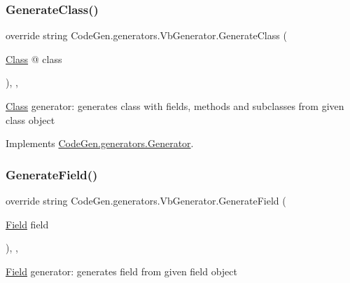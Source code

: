 \subsubsection{\texorpdfstring{Generate\+Class()}{GenerateClass()}}
{\footnotesize\ttfamily override string Code\+Gen.\+generators.\+Vb\+Generator.\+Generate\+Class (\begin{DoxyParamCaption}\item[{\mbox{\hyperlink{classCodeGen_1_1generators_1_1Class}{Class}} @}]{class }\end{DoxyParamCaption})\hspace{0.3cm}{\ttfamily [inline]}, {\ttfamily [protected]}, {\ttfamily [virtual]}}



\mbox{\hyperlink{classCodeGen_1_1generators_1_1Class}{Class}} generator\+: generates class with fields, methods and subclasses from given class object  



Implements \mbox{\hyperlink{classCodeGen_1_1generators_1_1Generator_a8847fd8b6d408a0dfc087dcc1dc58340}{Code\+Gen.\+generators.\+Generator}}.

\mbox{\label{classCodeGen_1_1generators_1_1VbGenerator_a114f5fcd8cc13180701041b6d9815f3f}} 
\subsubsection{\texorpdfstring{Generate\+Field()}{GenerateField()}}
{\footnotesize\ttfamily override string Code\+Gen.\+generators.\+Vb\+Generator.\+Generate\+Field (\begin{DoxyParamCaption}\item[{\mbox{\hyperlink{classCodeGen_1_1generators_1_1Field}{Field}}}]{field }\end{DoxyParamCaption})\hspace{0.3cm}{\ttfamily [inline]}, {\ttfamily [protected]}, {\ttfamily [virtual]}}



\mbox{\hyperlink{classCodeGen_1_1generators_1_1Field}{Field}} generator\+: generates field from given field object  



